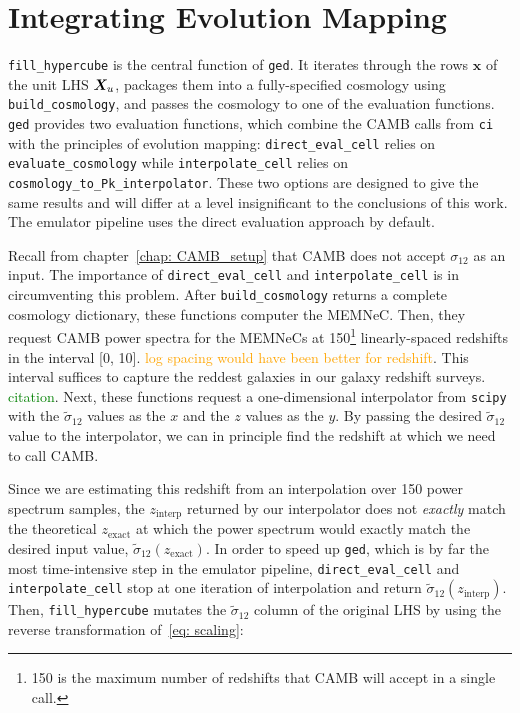 \section{Integrating Evolution Mapping}
\label{sec: generate_emu_data}



\verb|fill_hypercube| is the central function of \texttt{ged}. It iterates 
through the rows $\bm{x}$ of the unit LHS
$\bm{X}_u$, packages them into a fully-specified cosmology using
\verb|build_cosmology|, and passes the cosmology to one of the 
evaluation functions. \texttt{ged} provides two evaluation functions, which 
combine the CAMB calls from \texttt{ci} with the
principles of evolution mapping: \verb|direct_eval_cell| relies on
\verb|evaluate_cosmology| while \verb|interpolate_cell| relies on
\verb|cosmology_to_Pk_interpolator|. These two options are designed to give
the same results and will differ at a level insignificant to the conclusions
of this work. The emulator pipeline uses the direct evaluation approach by
default.


Recall from chapter~\ref{chap: CAMB_setup} that CAMB does not accept
$\sigma_{12}$ as an input. The importance of \verb|direct_eval_cell| and 
\verb|interpolate_cell| is in circumventing this problem.
After \verb|build_cosmology| returns a complete cosmology dictionary, these
functions computer the MEMNeC. Then, they request CAMB power spectra for the
MEMNeCs at 150\footnote{150 is the maximum number of redshifts that CAMB will
accept in a single call.} linearly-spaced redshifts in the
interval [0, 10]. \textcolor{orange}{log spacing would have been better for
redshift}. This interval suffices to capture the reddest galaxies
in our galaxy redshift surveys. \textcolor{green}{citation}. Next, these
functions request a one-dimensional interpolator from \texttt{scipy} with
the $\tilde{\sigma}_{12}$ values as the $x$ and the $z$ values as the $y$.
By passing the desired $\tilde{\sigma}_{12}$ value to the interpolator, we
can in principle find the redshift at which we need to call CAMB.


Since we are estimating this redshift from an interpolation over 150 power
spectrum samples, the $z_\text{interp}$ returned by our interpolator does not
\textit{exactly} match the theoretical $z_\text{exact}$ at which the
power spectrum would exactly match the desired input value,
$\tilde{\sigma}_{12}(z_\text{exact})$. In order to speed up \texttt{ged},
which is by far the most time-intensive step in the emulator pipeline,
\verb|direct_eval_cell| and \verb|interpolate_cell| stop at one iteration of 
interpolation and return $\tilde{\sigma}_{12}(z_\text{interp})$. Then,
\verb|fill_hypercube| mutates the $\tilde{\sigma}_{12}$ column of the original 
LHS by using the reverse transformation of~\ref{eq: scaling}:

